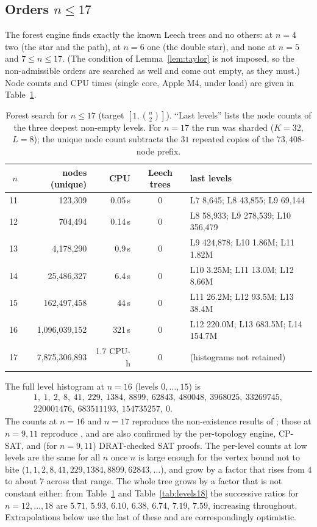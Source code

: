 \documentclass[11pt,a4paper]{article}
\theoremstyle{plain}
\theoremstyle{remark}
\newcommand{\bin}[2]{\binom{#1}{#2}}
\begin{document}
\subsection{Orders \texorpdfstring{$n\le 17$}{n <= 17}}\label{sec:small}

The forest engine finds exactly the known Leech trees and no others: at $n=4$
two (the star and the path), at $n=6$ one (the double star), and none at $n=5$
and $7\le n\le 17$.  (The condition of Lemma~\ref{lem:taylor} is not imposed, so
the non-admissible orders are searched as well and come out empty, as they
must.)  Node counts and CPU times (single core, Apple M4, under load) are given
in Table~\ref{tab:small}.

\begin{table}[ht]
\centering
\caption{Forest search for $n\le 17$ (target $[1,\bin n2]$).  ``Last levels''
lists the node counts of the three deepest non-empty levels.  For $n=17$ the
run was sharded ($K=32$, $L=8$); the unique node count subtracts the $31$
repeated copies of the $73{,}408$-node prefix.}
\label{tab:small}
\small
\begin{tabular}{@{}rrrcl@{}}
\toprule
$n$ & nodes (unique) & CPU & Leech trees & last levels\\
\midrule
11 & 123,309 & 0.05\,s & 0 & L7 8,645; L8 43,855; L9 69,144\\
12 & 704,494 & 0.14\,s & 0 & L8 58,933; L9 278,539; L10 356,479\\
13 & 4,178,290 & 0.9\,s & 0 & L9 424,878; L10 1.86M; L11 1.82M\\
14 & 25,486,327 & 6.4\,s & 0 & L10 3.25M; L11 13.0M; L12 8.66M\\
15 & 162,497,458 & 44\,s & 0 & L11 26.2M; L12 93.5M; L13 38.4M\\
16 & 1,096,039,152 & 321\,s & 0 & L12 220.0M; L13 683.5M; L14 154.7M\\
17 & 7,875,306,893 & 1.7 CPU-h & 0 & (histograms not retained)\\
\bottomrule
\end{tabular}
\end{table}

The full level histogram at $n=16$ (levels $0,\dots,15$) is
\begin{multline*}
1,\ 1,\ 2,\ 8,\ 41,\ 229,\ 1384,\ 8899,\ 62843,\ 480048,\ 3968025,\ 33269745,\\
220001476,\ 683511193,\ 154735257,\ 0.
\end{multline*}  The counts at $n=16$ and $n=17$ reproduce
the non-existence results of \cite{Calhoun2007}; those at $n=9,11$ reproduce
\cite{SzekelyWangZhang2005}, and are also confirmed by the per-topology engine,
CP-SAT, and (for $n=9,11$) DRAT-checked SAT proofs.  The per-level counts at
low levels are the same for all $n$ once $n$ is large enough for the vertex
bound not to bite ($1,1,2,8,41,229,1384,8899,62843,\dots$), and grow by a factor
that rises from $4$ to about $7$ across that range.  The whole tree grows by a
factor that is not constant either: from Table~\ref{tab:small} and
Table~\ref{tab:levels18} the successive ratios for $n=12,\dots,18$ are
$5.71$, $5.93$, $6.10$, $6.38$, $6.74$, $7.19$, $7.59$, increasing throughout.
Extrapolations below use the last of these and are correspondingly optimistic.
\end{document}
